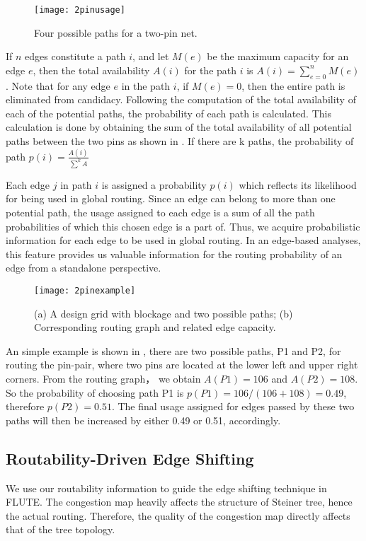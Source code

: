 \begin{itemize}
\begin{figure}[tbh!]
    \centering
    \texttt{[image: 2pinusage]}
    \caption{Four possible paths for a two-pin net.}
    \label{fig:2pinusage}
\end{figure}

If $n$ edges constitute a path $i$, and let $M(e)$ be the maximum capacity for an edge $e$, then the total availability $A(i)$ for the path $i$ is $A(i)=\sum_{e=0}^{n}M(e)$. Note that for any edge $e$ in the path $i$, if $M(e)=0$, then the entire path is eliminated from candidacy. Following the computation of the total availability of each of the potential paths, the probability of each path is calculated. This calculation is done by obtaining the sum of the total availability of all potential paths between the two pins as shown in .
If there are k paths, the probability of path $p(i)=\frac{A(i)}{\sum^{k}A}$

Each edge $j$ in path $i$ is assigned a probability $p(i)$ which reflects its likelihood for being used in global routing. Since an edge can belong to more than one potential path, the usage assigned to each edge is a sum of all the path probabilities of which this chosen edge is a part of. Thus, we acquire probabilistic information for each edge to be used in global routing. In an edge-based analyses, this feature provides us valuable information for the routing probability of an edge from a standalone perspective.

\begin{figure}[tb!]
    \centerline{\texttt{[image: 2pinexample]}}
    \caption{(a) A design grid with blockage and two possible paths; (b) Corresponding routing graph and related edge capacity.}
    \label{fig:2pinexample}
\end{figure}
An simple example is shown in , there are two possible paths, P1 and P2, for routing the pin-pair, where two pins are located at the lower left and upper right corners. From the routing graph， we obtain $A(P1)=106$ and $A(P2)=108$. So the probability of choosing path P1 is $p(P1)=106/(106+108)=0.49$, therefore $p(P2)=0.51$. The final usage assigned for edges passed by these two paths will then be increased by either 0.49 or 0.51, accordingly.
\end{itemize}

\subsection{Routability-Driven Edge Shifting}
We use our routability information to guide the edge shifting technique in FLUTE\cite{fastroute}. The congestion map heavily affects the structure of Steiner tree, hence the actual routing. Therefore, the quality of the congestion map directly affects that of the tree topology.

